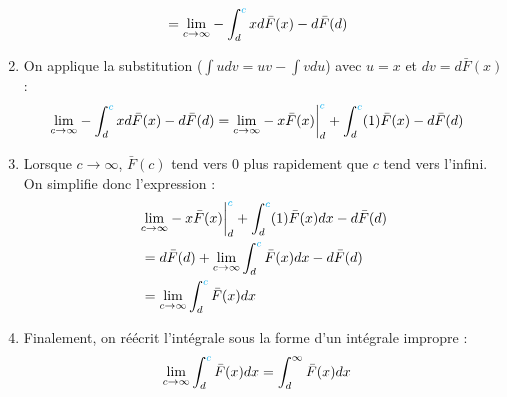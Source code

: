 \documentclass[10pt, french]{article}
\begin{document}
\begin{multicols*}{2}
\begin{enumerate}[resume]
\begin{align*}
		&=	\underset{c \rightarrow \infty}{\lim} -\int_{d}^{{\color{cyan}c}} x d\bar{F}(x) - d\bar{F}(d)	
		\end{align*}
	\item	On applique la substitution ($\int udv = uv - \int vdu$) avec $u = x$ et $dv = d\bar{F}(x)$ : 
		\begin{align*}
		\underset{c \rightarrow \infty}{\lim} -\int_{d}^{{\color{cyan}c}} x d\bar{F}(x) - d\bar{F}(d)	
		&=	\underset{c \rightarrow \infty}{\lim} - x\bar{F}(x)\bigg|_{d}^{{\color{cyan}c}} + \int_{d}^{{\color{cyan}c}} (1) \bar{F}(x) - d\bar{F}(d)	
		\end{align*}
	\item	Lorsque $c \rightarrow \infty$, $\bar{F}(c)$ tend vers 0 plus rapidement que $c$ tend vers l'infini. On simplifie donc l'expression : 
		\begin{align*}
		&\underset{c \rightarrow \infty}{\lim} - x\bar{F}(x)\bigg|_{d}^{{\color{cyan}c}} + \int_{d}^{{\color{cyan}c}} (1) \bar{F}(x)dx - d\bar{F}(d)	\\
		&=	d\bar{F}(d) + \underset{c \rightarrow \infty}{\lim} \int_{d}^{{\color{cyan}c}} \bar{F}(x)dx - d\bar{F}(d)	\\
		&=	 \underset{c \rightarrow \infty}{\lim} \int_{d}^{{\color{cyan}c}} \bar{F}(x)dx
		\end{align*}
	\item	Finalement, on réécrit l'intégrale sous la forme d'un intégrale impropre :
		\begin{align*}
		\underset{c \rightarrow \infty}{\lim} \int_{d}^{{\color{cyan}c}} \bar{F}(x)dx
		&=	\int_{d}^{\infty} \bar{F}(x) dx
		\end{align*}
\end{enumerate}

\end{multicols*}
\end{document}
